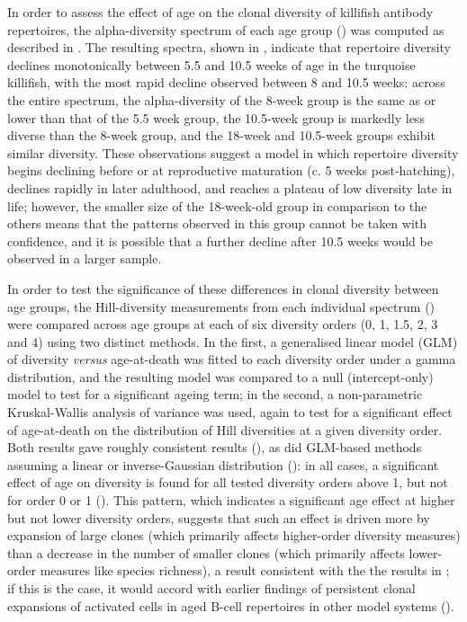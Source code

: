 In order to assess the effect of age on the clonal diversity of killifish antibody repertoires, the alpha-diversity spectrum of each age group () was computed as described in . The resulting spectra, shown in , indicate that repertoire diversity declines monotonically between 5.5 and 10.5 weeks of age in the turquoise killifish, with the most rapid decline observed between 8 and 10.5 weeks: across the entire spectrum, the alpha-diversity of the 8-week group is the same as or lower than that of the 5.5 week group, the 10.5-week group is markedly less diverse than the 8-week group, and the 18-week and 10.5-week groups exhibit similar diversity. These observations suggest a model in which repertoire diversity begins declining before or at reproductive maturation (c. 5 weeks post-hatching), declines rapidly in later adulthood, and reaches a plateau of low diversity late in life; however, the smaller size of the 18-week-old group in comparison to the others means that the patterns observed in this group cannot be taken with confidence, and it is possible that a further decline after 10.5 weeks would be observed in a larger sample.

In order to test the significance of these differences in clonal diversity between age groups, the Hill-diversity measurements from each individual spectrum () were compared across age groups at each of six diversity orders (0, 1, 1.5, 2, 3 and 4) using two distinct methods. In the first, a generalised linear model (GLM) of diversity \textit{versus} age-at-death was fitted to each diversity order under a gamma distribution, and the resulting model was compared to a null (intercept-only) model to test for a significant ageing term; in the second, a non-parametric Kruskal-Wallis analysis of variance was used, again to test for a significant effect of age-at-death on the distribution of Hill diversities at a given diversity order. Both results gave roughly consistent results (), as did GLM-based methods assuming a linear or inverse-Gaussian distribution (): in all cases, a significant effect of age on diversity is found for all tested diversity orders above 1, but not for order 0 or 1 (). This pattern, which indicates a significant age effect at higher but not lower diversity orders, suggests that such an effect is driven more by expansion of large clones (which primarily affects higher-order diversity measures) than a decrease in the number of smaller clones (which primarily affects lower-order measures like species richness), a result consistent with the the results in ; if this is the case, it would accord with earlier findings of persistent clonal expansions of activated cells in aged B-cell repertoires in other model systems ().

